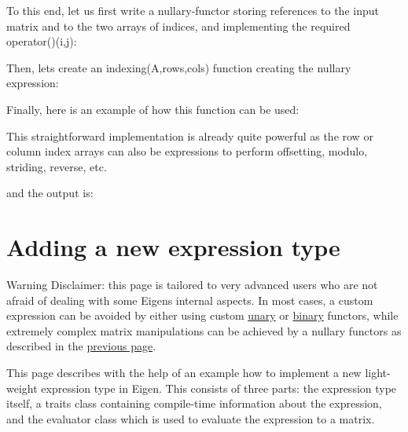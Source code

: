 \begin{DoxyCodeInclude}
\end{DoxyCodeInclude}
 To this end, let us first write a nullary-\/functor storing references to the input matrix and to the two arrays of indices, and implementing the required {\ttfamily operator()(i,j)}\+:


\begin{DoxyCodeInclude}
\end{DoxyCodeInclude}
 Then, let\textquotesingle{}s create an {\ttfamily indexing(\+A,rows,cols)} function creating the nullary expression\+:


\begin{DoxyCodeInclude}
\end{DoxyCodeInclude}
 Finally, here is an example of how this function can be used\+:


\begin{DoxyCodeInclude}
\end{DoxyCodeInclude}
 This straightforward implementation is already quite powerful as the row or column index arrays can also be expressions to perform offsetting, modulo, striding, reverse, etc.


\begin{DoxyCodeInclude}
\end{DoxyCodeInclude}
 and the output is\+:


\begin{DoxyCodeInclude}
\end{DoxyCodeInclude}
\hypertarget{TopicNewExpressionType}{}\section{Adding a new expression type}\label{TopicNewExpressionType}
\begin{DoxyWarning}{Warning}
Disclaimer\+: this page is tailored to very advanced users who are not afraid of dealing with some Eigen\textquotesingle{}s internal aspects. In most cases, a custom expression can be avoided by either using custom \hyperlink{group___core___module_a03db69599e5dc10f9b7524bbdd0bdcbb}{unary} or \hyperlink{group___core___module_a62e662227f0ef8ce077a44a46510507d}{binary} functors, while extremely complex matrix manipulations can be achieved by a nullary functors as described in the \hyperlink{TopicCustomizing_NullaryExpr}{previous page}.
\end{DoxyWarning}
This page describes with the help of an example how to implement a new light-\/weight expression type in Eigen. This consists of three parts\+: the expression type itself, a traits class containing compile-\/time information about the expression, and the evaluator class which is used to evaluate the expression to a matrix.

